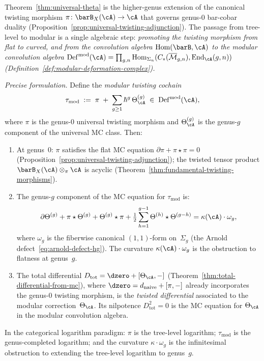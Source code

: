 \begin{remark}
\label{rem:theta-modular-twisting}
Theorem~\ref{thm:universal-theta} is the higher-genus extension
of the canonical twisting morphism $\pi \colon \barB_X(\cA) \to \cA$
that governs genus-$0$ bar-cobar duality
(Proposition~\ref{prop:universal-twisting-adjunction}).
The passage from tree-level to modular is a single algebraic step:
\emph{promoting the twisting morphism from flat to curved, and from
the convolution algebra $\mathrm{Hom}(\barB, \cA)$ to the modular
convolution algebra
$\operatorname{Def}^{\mathrm{mod}}(\cA) =
\prod_{g,n} \mathrm{Hom}_{\Sigma_n}(C_*(\overline{\mathcal{M}}_{g,n}),
\operatorname{End}_\cA(g,n))$
\textup{(}Definition~\textup{\ref{def:modular-deformation-complex})}.}

\emph{Precise formulation.}
Define the \emph{modular twisting cochain}
\begin{equation}\label{eq:modular-twisting-cochain}
\tau_{\mathrm{mod}}
\;:=\;
\pi \;+\; \sum_{g \geq 1} \hbar^{g}\,
\Theta_\cA^{(g)}
\;\in\;
\operatorname{Def}^{\mathrm{mod}}(\cA),
\end{equation}
where $\pi$ is the genus-$0$ universal twisting morphism and
$\Theta_\cA^{(g)}$ is the genus-$g$ component of the universal MC
class.  Then:
\begin{enumerate}[label=\textup{(\alph*)}]
\item At genus~$0$: $\pi$ satisfies the flat MC equation
  $\partial\pi + \pi \star \pi = 0$
  (Proposition~\ref{prop:universal-twisting-adjunction}); the
  twisted tensor product $\barB_X(\cA) \otimes_\pi \cA$ is acyclic
  (Theorem~\ref{thm:fundamental-twisting-morphisms}).
\item The genus-$g$ component of the MC equation for
  $\tau_{\mathrm{mod}}$ is:
  \[
  \partial\Theta^{(g)} + \pi \star \Theta^{(g)}
  + \Theta^{(g)} \star \pi
  + \tfrac{1}{2}\sum_{h=1}^{g-1}
  \Theta^{(h)} \star \Theta^{(g-h)}
  = \kappa(\cA) \cdot \omega_g,
  \]
  where $\omega_g$ is the fiberwise canonical $(1,1)$-form
  on~$\Sigma_g$ (the Arnold defect~\eqref{eq:arnold-defect-hg}).
  The curvature $\kappa(\cA) \cdot \omega_g$ is the
  obstruction to flatness at genus~$g$.
\item The total differential
  $D_{\mathrm{tot}} = \dzero + [\Theta_\cA, -]$
  (Theorem~\ref{thm:total-differential-from-mc}), where
  $\dzero = d_{\mathrm{naive}} + [\pi, -]$ already
  incorporates the genus-$0$ twisting morphism, is the
  \emph{twisted differential} associated to the modular
  correction~$\Theta_\cA$.  Its nilpotence
  $D_{\mathrm{tot}}^2 = 0$ is the MC equation for
  $\Theta_\cA$ in the modular convolution algebra.
\end{enumerate}
In the categorical logarithm paradigm: $\pi$ is the tree-level
logarithm; $\tau_{\mathrm{mod}}$ is the genus-completed logarithm;
and the curvature $\kappa \cdot \omega_g$ is the infinitesimal
obstruction to extending the tree-level logarithm to genus~$g$.
\end{remark}


